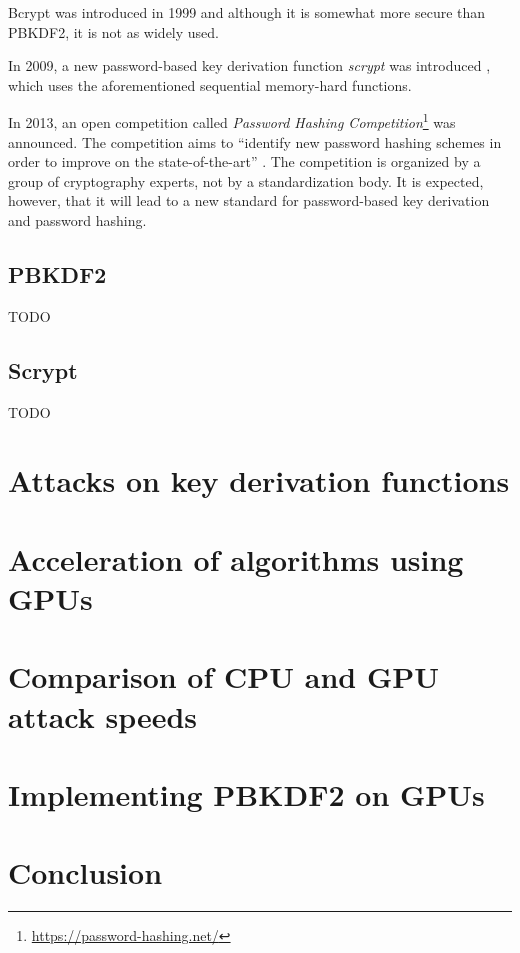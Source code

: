 \documentclass[12pt,oneside]{fithesis2}
\begin{document}
      Bcrypt was introduced in 1999 \cite{bcrypt} and although it is somewhat more secure than PBKDF2, it is not as widely used.
      
      In 2009, a new password-based key derivation function \emph{scrypt} was introduced \cite{scrypt}, which uses the aforementioned sequential memory-hard functions.
      
      In 2013, an open competition called \emph{Password Hashing Competition}\footnote{\url{https://password-hashing.net/}} was announced. The competition aims to ``identify new password hashing schemes in order to improve on the state-of-the-art'' \cite{phc}. The competition is organized by a group of cryptography experts, not by a standardization body. It is expected, however, that it will lead to a new standard for password-based key derivation and password hashing.
      
      \section{PBKDF2}
      TODO
      
      \section{Scrypt}
      TODO
      
    \chapter{Attacks on key derivation functions}
    \chapter{Acceleration of algorithms using GPUs}
    \chapter{Comparison of CPU and GPU attack speeds}
    \chapter{Implementing PBKDF2 on GPUs}
    \chapter{Conclusion}
    
    \iffalse
    \appendix
    \chapter{First appendix}        %
    TODO
    \chapter{Another appendix}
    TODO
    \fi
    
    
    
    
\end{document}
